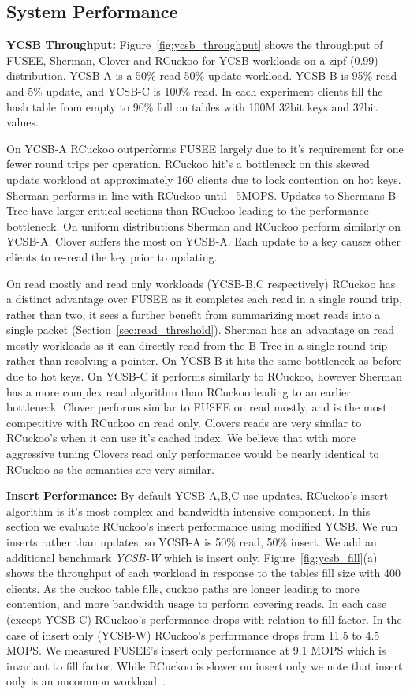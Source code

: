 \subsection{System Performance}

\textbf{YCSB Throughput:} Figure~\ref{fig:ycsb_throughput} shows
the throughput of FUSEE, Sherman, Clover and RCuckoo for
YCSB workloads on a zipf (0.99) distribution. YCSB-A is a
50\% read 50\% update workload.  YCSB-B is 95\% read and 5\%
update, and YCSB-C is 100\% read.  In each experiment
clients fill the hash table from empty to 90\% full on
tables with 100M 32bit keys and 32bit values.

On YCSB-A RCuckoo outperforms FUSEE largely due to it's
requirement for one fewer round trips per operation. RCuckoo
hit's a bottleneck on this skewed update workload at
approximately 160 clients due to lock contention on hot
keys. Sherman performs in-line with RCuckoo until ~5MOPS.
Updates to Shermans B-Tree have larger critical sections
than RCuckoo leading to the performance bottleneck. On
uniform distributions Sherman and RCuckoo perform similarly
on YCSB-A. Clover suffers the most on YCSB-A. Each update to
a key causes other clients to re-read the key prior to
updating.

On read mostly and read only workloads (YCSB-B,C
respectively) RCuckoo has a distinct advantage over FUSEE as
it completes each read in a single round trip, rather than
two, it sees a further benefit from summarizing most reads
into a single packet (Section~\ref{sec:read_threshold}).
Sherman has an advantage on read mostly workloads as it can
directly read from the B-Tree in a single round trip rather
than resolving a pointer. On YCSB-B it hits the same
bottleneck as before due to hot keys. On YCSB-C it performs
similarly to RCuckoo, however Sherman has a more complex
read algorithm than RCuckoo leading to an earlier
bottleneck. Clover performs similar to FUSEE on read mostly,
and is the most competitive with RCuckoo on read only.
Clovers reads are very similar to RCuckoo's when it can use
it's cached index. We believe that with more aggressive
tuning Clovers read only performance would be nearly
identical to RCuckoo as the semantics are very similar.


\textbf{Insert Performance:}
By default YCSB-A,B,C use updates. RCuckoo's insert
algorithm is it's most complex and bandwidth intensive
component. In this section we evaluate RCuckoo's insert
performance using modified YCSB. We run inserts rather than
updates, so YCSB-A is 50\% read, 50\% insert. We add an
additional benchmark \textit{YCSB-W} which is insert only.
Figure~\ref{fig:ycsb_fill}(a) shows the throughput
of each workload in response to the tables fill size with
400 clients. As the cuckoo table fills, cuckoo paths are
longer leading to more contention, and more bandwidth usage
to perform covering reads. In each case (except YCSB-C)
RCuckoo's performance drops with relation to fill factor. In
the case of insert only (YCSB-W) RCuckoo's performance drops
from 11.5 to 4.5 MOPS. We measured FUSEE's insert only
performance at 9.1 MOPS which is invariant to fill factor.
While RCuckoo is slower on insert only we note that insert
only is an uncommon workload~\cite{facebook-memcached}.

